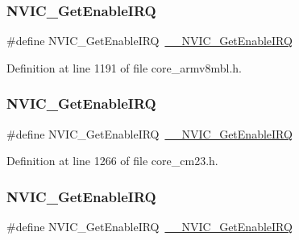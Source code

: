 \subsubsection{\texorpdfstring{N\+V\+I\+C\+\_\+\+Get\+Enable\+I\+RQ}{NVIC\_GetEnableIRQ}\hspace{0.1cm}{\footnotesize\ttfamily [5/13]}}
{\footnotesize\ttfamily \#define N\+V\+I\+C\+\_\+\+Get\+Enable\+I\+RQ~\hyperlink{group___c_m_s_i_s___core___n_v_i_c_functions_gaaeb5e7cc0eaad4e2817272e7bf742083}{\+\_\+\+\_\+\+N\+V\+I\+C\+\_\+\+Get\+Enable\+I\+RQ}}



Definition at line 1191 of file core\+\_\+armv8mbl.\+h.

\mbox{\label{group___c_m_s_i_s___core___n_v_i_c_functions_ga857de13232ec65dd15087eaa15bc4a69}} 
\subsubsection{\texorpdfstring{N\+V\+I\+C\+\_\+\+Get\+Enable\+I\+RQ}{NVIC\_GetEnableIRQ}\hspace{0.1cm}{\footnotesize\ttfamily [6/13]}}
{\footnotesize\ttfamily \#define N\+V\+I\+C\+\_\+\+Get\+Enable\+I\+RQ~\hyperlink{group___c_m_s_i_s___core___n_v_i_c_functions_gaaeb5e7cc0eaad4e2817272e7bf742083}{\+\_\+\+\_\+\+N\+V\+I\+C\+\_\+\+Get\+Enable\+I\+RQ}}



Definition at line 1266 of file core\+\_\+cm23.\+h.

\mbox{\label{group___c_m_s_i_s___core___n_v_i_c_functions_ga857de13232ec65dd15087eaa15bc4a69}} 
\subsubsection{\texorpdfstring{N\+V\+I\+C\+\_\+\+Get\+Enable\+I\+RQ}{NVIC\_GetEnableIRQ}\hspace{0.1cm}{\footnotesize\ttfamily [7/13]}}
{\footnotesize\ttfamily \#define N\+V\+I\+C\+\_\+\+Get\+Enable\+I\+RQ~\hyperlink{group___c_m_s_i_s___core___n_v_i_c_functions_gaaeb5e7cc0eaad4e2817272e7bf742083}{\+\_\+\+\_\+\+N\+V\+I\+C\+\_\+\+Get\+Enable\+I\+RQ}}



